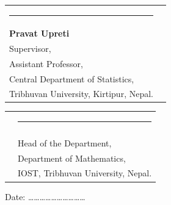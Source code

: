 \vspace{0.4cm}

\noindent
\begin{tabular}{@{}p{7.5cm}p{7cm}@{}}
\rule{5.5cm}{0.4pt}
    & \\[0.3cm]
\textbf{Pravat Upreti}
    & \\[0.1cm]
Supervisor,
    & \\[0.1cm]
Assistant Professor,
    & \\
Central Department of Statistics,
    & \\
Tribhuvan University, Kirtipur, Nepal.
    & \\
\end{tabular}

\vspace{0.4cm}

\noindent
\begin{tabular}{@{}p{7.5cm}p{7cm}@{}}
    & \rule{5.5cm}{0.4pt} \\[0.3cm]
    & \textbf{} \\[0.1cm]
    & Head of the Department, \\[0.1cm]
    & Department of Mathematics, \\
    & IOST, Tribhuvan University, Nepal. \\
\end{tabular}

\vspace{0.4cm}

\noindent
Date: \ldots\ldots\ldots\ldots\ldots\ldots\ldots\ldots\ldots\ldots